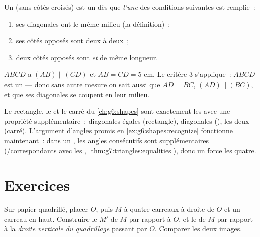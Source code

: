\begin{theorem}\label{thm:g7:central:recognize}
Un  (sans côtés croisés) est un  dès que
\emph{l'une} des conditions suivantes est remplie~:
\begin{enumerate}
  \item ses diagonales ont le même milieu (la définition)~;
  \item ses côtés opposés sont  deux à deux~;
  \item deux côtés opposés sont  \emph{et} de même
        longueur.
\end{enumerate}
\end{theorem}
\admitted

\begin{example}\label{ex:g7:central:recognize}
$ABCD$ a $(AB) \parallel (CD)$ et $AB = CD = 5$ cm. Le critère 3
s'applique~: $ABCD$ est un  --- donc sans autre mesure
on sait aussi que $AD = BC$, $(AD) \parallel (BC)$, et que ses
diagonales se coupent en leur milieu.
\end{example}

\begin{remark}
Le rectangle, le  et le carré du \cref{ch:g6:shapes} sont
exactement les  avec une propriété
supplémentaire~: diagonales égales (rectangle), diagonales
 (), les deux (carré). L'argument d'angles
promis en \cref{ex:g6:shapes:recognize} fonctionne maintenant~: dans
un , les angles consécutifs sont supplémentaires
(/correspondants avec les ,
\cref{thm:g7:triangles:equalities}), donc un  force les
quatre.
\end{remark}

\section{Exercices}

\begin{exercise}[$\star$]\label{exo:g7:central:1}
Sur papier quadrillé, placer $O$, puis $M$ à quatre carreaux à droite
de $O$ et un carreau en haut. Construire le  $M'$ de $M$
par rapport à $O$, et le  de $M$ par rapport à la
\emph{droite verticale du quadrillage} passant par $O$. Comparer les
deux images.
\end{exercise}


